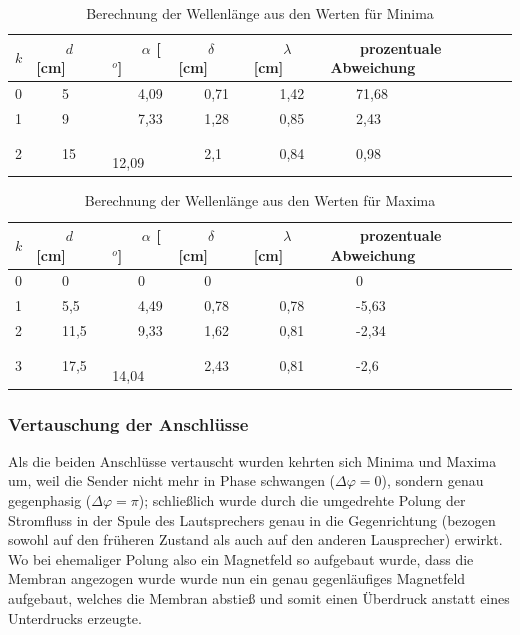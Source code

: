 \begin{table}
\centering
\begin{tabular}{l|l|l|l|l|l}
\(k\)	&~~~	\(d\) [cm]	&~~~	\(\alpha\) [\(^o\)]	&~~~	\(\delta\) [cm]	&~~~	\(\lambda\) [cm]	&~~~	prozentuale Abweichung\\
\hline
0	&~~~	5	&~~~	4,09	&~~~	0,71	&~~~	1,42	&~~~	71,68\\
1	&~~~	9	&~~~	7,33	&~~~	1,28	&~~~	0,85	&~~~	2,43\\
2	&~~~	15	&~~~	12,09	&~~~	2,1	&~~~	0,84	&~~~	0,98
\end{tabular}
\caption{Berechnung der Wellenlänge aus den Werten für Minima}
\label{tab_lambda_d_min}
\end{table}


\begin{table}
\centering
\begin{tabular}{l|l|l|l|l|l}
\(k\)	&~~~	\(d\) [cm]	&~~~	\(\alpha\) [\(^o\)]	&~~~	\(\delta\) [cm]	&~~~	\(\lambda\) [cm]	&~~~	prozentuale Abweichung\\
\hline
0	&~~~	0	&~~~	0	&~~~	0	&~~~		&~~~	0\\
1	&~~~	5,5	&~~~	4,49	&~~~	0,78	&~~~	0,78	&~~~	-5,63\\
2	&~~~	11,5	&~~~	9,33	&~~~	1,62	&~~~	0,81	&~~~	-2,34\\
3	&~~~	17,5	&~~~	14,04	&~~~	2,43	&~~~	0,81	&~~~	-2,6
\end{tabular}
\caption{Berechnung der Wellenlänge aus den Werten für Maxima}
\label{tab_lambda_d_max}
\end{table}




\subsubsection{Vertauschung der Anschlüsse}


Als die beiden Anschlüsse vertauscht wurden kehrten sich Minima und Maxima um, weil die Sender nicht mehr in Phase schwangen (\(\Delta \varphi = 0\)), sondern genau gegenphasig (\(\Delta \varphi = \pi\)); schließlich wurde durch die umgedrehte Polung der Stromfluss in der Spule des Lautsprechers genau in die Gegenrichtung (bezogen sowohl auf den früheren Zustand als auch auf den anderen Lausprecher) erwirkt. Wo bei ehemaliger Polung also ein Magnetfeld so aufgebaut wurde, dass die Membran angezogen wurde wurde nun ein genau gegenläufiges Magnetfeld aufgebaut, welches die Membran abstieß und somit einen Überdruck anstatt eines Unterdrucks erzeugte.



